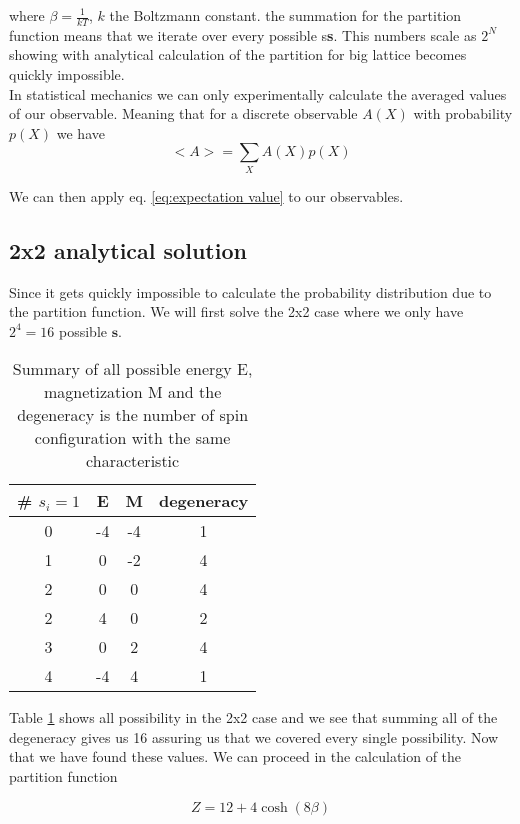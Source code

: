 \documentclass[english,notitlepage,reprint,nofootinbib]{revtex4-2}  %
\begin{document}
	where $\beta = \frac{1}{kT}$, $k$ the Boltzmann constant. the summation for the partition
	function means that we iterate over every possible s\textbf{s}. This numbers scale as $2^N$
	showing with analytical calculation of the partition for big lattice becomes quickly 
	impossible. \\
	
	In statistical mechanics we can only experimentally calculate the averaged values of our 
	observable. Meaning that for a discrete observable $A(X)$ with probability $p(X)$ we have 
	\begin{equation}
		<A> = \sum_{X}A(X)p(X) \label{eq:expectation value}
	\end{equation} 
	
	We can then apply eq. \ref{eq:expectation value} to our observables. 
 	
	\subsection{2x2 analytical solution}
	
	Since it gets quickly impossible to calculate the probability distribution due to the 
	partition function. We will first solve the 2x2 case where we only have $2^4=16$ possible
	$\textbf{s}$. 
	\begin{table}[h!]
	\centering
	\begin{tabular}{|c|c|c|c|}
		\hline
		\# $s_i=1$ & E & M & degeneracy \\
		\hline
		\hline
		0 & -4 &  -4 &  1  \\
		1 & 0&   -2&   4  \\ 
		2 & 0 & 0&  4  \\
		2 & 4 & 0 &  2 \\
		3 & 0  & 2 & 4 \\
		4 & -4 & 4 & 1 \\
		\hline
	\end{tabular}
	\caption{ Summary of all possible energy E, magnetization M and the degeneracy is the 
	number of spin configuration with the same characteristic} \label{tab:summary2x2}
	\end{table} 
	
	Table \ref{tab:summary2x2} shows all possibility in the 2x2 case and we see that summing all
	of the degeneracy gives us 16 assuring us that we covered every single possibility. Now that
	we have found these values. We can proceed in the calculation of the partition function
	
	\begin{equation}
		Z = 12 + 4\cosh(8\beta) \label{eq:Analytical_partition} 
	\end{equation}
\end{document}
